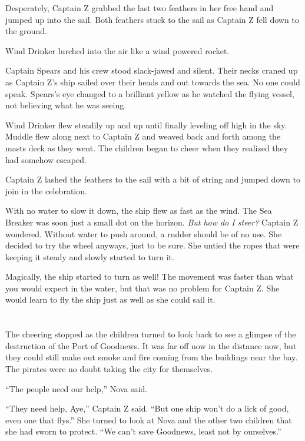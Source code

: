\documentclass[12pt]{extbook}
\begin{document}
  Desperately, Captain Z grabbed the last two feathers in her free hand
  and jumped up into the sail. Both feathers stuck to the sail as Captain
  Z fell down to the ground.
  
  Wind Drinker lurched into the air like a wind powered rocket.
  
  Captain Spears and his crew stood slack-jawed and silent. Their necks
  craned up as Captain Z's ship sailed over their heads and out towards
  the sea. No one could speak. Spears's eye changed to a brilliant yellow
  as he watched the flying vessel, not believing what he was seeing.
  
  Wind Drinker flew steadily up and up until finally leveling off high in
  the sky. Muddle flew along next to Captain Z and weaved back and forth
  among the masts deck as they went. The children began to cheer when they
  realized they had somehow escaped.
  
  Captain Z lashed the feathers to the sail with a bit of string and
  jumped down to join in the celebration.
  
  With no water to slow it down, the ship flew as fast as the wind. The
  Sea Breaker was soon just a small dot on the horizon. \emph{But how do I
  steer?} Captain Z wondered. Without water to push around, a rudder
  should be of no use. She decided to try the wheel anyways, just to be
  sure. She untied the ropes that were keeping it steady and slowly
  started to turn it.
  
  Magically, the ship started to turn as well! The movement was faster
  than what you would expect in the water, but that was no problem for
  Captain Z. She would learn to fly the ship just as well as she could
  sail it.
  
  \section{}\label{section-44}
  
  The cheering stopped as the children turned to look back to see a
  glimpse of the destruction of the Port of Goodnews. It was far off now
  in the distance now, but they could still make out smoke and fire coming
  from the buildings near the bay. The pirates were no doubt taking the
  city for themselves.
  
  \enquote{The people need our help,} Nova said.
  
  \enquote{They need help, Aye,} Captain Z said. \enquote{But one ship
  won't do a lick of good, even one that flys.} She turned to look at Nova
  and the other two children that she had sworn to protect. \enquote{We
  can't save Goodnews, least not by ourselves.}
  
\end{document}
